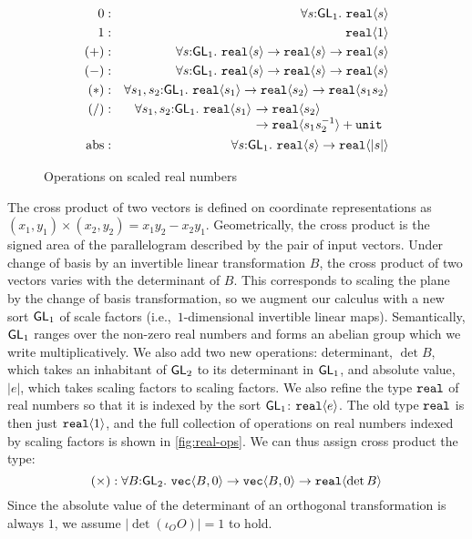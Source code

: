 \begin{figure}[t]
  \centering
  \begin{eqnarray*}
    0   &:& \forall s \mathord:\SynGL{1}.\ \tyPrim{real}{s} \\
    1   &:& \tyPrim{real}{1} \\
    (+) &:& \forall s \mathord:\SynGL{1}.\ \tyPrim{real}{s} \to \tyPrim{real}{s} \to \tyPrim{real}{s} \\
    (-) &:& \forall s \mathord:\SynGL{1}.\ \tyPrim{real}{s} \to \tyPrim{real}{s} \to \tyPrim{real}{s} \\
    (*) &:& \forall s_1,s_2 \mathord:\SynGL{1}.\ \tyPrim{real}{s_1} \to \tyPrim{real}{s_2} \to \tyPrim{real}{s_1s_2} \\
    (/) &:&
    \begin{array}[t]{@{}l@{}l}
      \forall s_1,s_2 \mathord:\SynGL{1}.\ \tyPrim{real}{s_1}\ & \to \tyPrim{real}{s_2} \\
      &\to \tyPrim{real}{s_1s_2^{-1}} + \tyPrimNm{unit} \\
    \end{array}\\
    \mathrm{abs} &:& \forall s \mathord:\SynGL{1}.\ \tyPrim{real}{s} \to \tyPrim{real}{|s|} %
  \end{eqnarray*}
  \caption{Operations on scaled real numbers}
  \label{fig:real-ops}
\end{figure}

The cross product of two vectors is defined on coordinate
representations as $(x_1,y_1) \times (x_2,y_2) = x_1y_2 - x_2y_1$.
Geometrically, the cross product is the signed area of the
parallelogram described by the pair of input vectors.  Under change of
basis by an invertible linear transformation $B$, the cross product of
two vectors varies with the determinant of $B$. This corresponds to
scaling the plane by the change of basis transformation, so we augment
our calculus with a new sort $\mathsf{GL}_1$ of scale factors
(i.e.,~$1$-dimensional invertible linear maps). Semantically,
$\mathsf{GL}_1$ ranges over the non-zero real numbers and forms an abelian
group which we write multiplicatively. We also add two new operations:
determinant, $\det B$, which takes an inhabitant of $\mathsf{GL}_2$ to its
determinant in $\mathsf{GL}_1$, and absolute value, $|e|$, which takes
scaling factors to scaling factors. We also refine the type
$\textup{\texttt{real}}$ of real numbers so that it is indexed by the sort
$\mathsf{GL}_1$: $\textup{\texttt{real}}\langle e \rangle$. The old type $\textup{\texttt{real}}$ is
then just $\textup{\texttt{real}}\langle 1 \rangle$, and the full collection of operations on
real numbers indexed by scaling factors is shown in
\autoref{fig:real-ops}. We can thus assign cross product the type:
\begin{displaymath}
  (\times) : \forall B \mathord: \mathsf{GL}_2.\ \textup{\texttt{vec}}\langle B,0 \rangle \to
  \textup{\texttt{vec}}\langle B,0 \rangle \to \textup{\texttt{real}}\langle \det B \rangle 
\end{displaymath}
Since the absolute value of the determinant of an orthogonal
transformation is always $1$, we assume $|\det (\iota_O O)| = 1$ to
hold.

